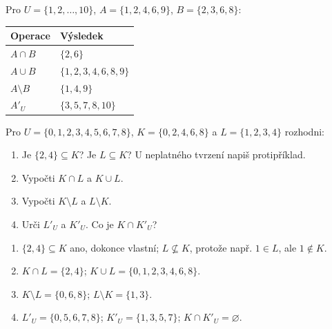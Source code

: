 \documentclass[11pt,a4paper]{article}
\begin{document}

Pro $U=\{1,2,\ldots,10\}$, $A=\{1,2,4,6,9\}$,
$B=\{2,3,6,8\}$:
\begin{center}
\begin{tabularx}{\linewidth}{@{}>{\raggedright\arraybackslash}p{35mm}X@{}}
\toprule
Operace & Výsledek\\
\midrule
$A\cap B$ & $\{2,6\}$\\
$A\cup B$ & $\{1,2,3,4,6,8,9\}$\\
$A\setminus B$ & $\{1,4,9\}$\\
$A'_U$ & $\{3,5,7,8,10\}$\\
\bottomrule
\end{tabularx}
\end{center}

\begin{zadaniReseniBox}[title={Samostatná práce 1}]
Pro $U=\{0,1,2,3,4,5,6,7,8\}$, $K=\{0,2,4,6,8\}$ a
$L=\{1,2,3,4\}$ rozhodni:
\begin{enumerate}[label=\alph*)]
\item Je $\{2,4\}\subseteq K$? Je $L\subseteq K$? U neplatného tvrzení
napiš protipříklad.
\item Vypočti $K\cap L$ a $K\cup L$.
\item Vypočti $K\setminus L$ a $L\setminus K$.
\item Urči $L'_U$ a $K'_U$. Co je $K\cap K'_U$?
\end{enumerate}
\tcblower
\begin{enumerate}[label=\alph*)]
\item $\{2,4\}\subseteq K$ ano, dokonce vlastní;
$L\nsubseteq K$, protože např. $1\in L$, ale $1\notin K$.
\item $K\cap L=\{2,4\}$;
$K\cup L=\{0,1,2,3,4,6,8\}$.
\item $K\setminus L=\{0,6,8\}$;
$L\setminus K=\{1,3\}$.
\item $L'_U=\{0,5,6,7,8\}$;
$K'_U=\{1,3,5,7\}$;
$K\cap K'_U=\varnothing$.
\end{enumerate}
\end{zadaniReseniBox}

\end{document}
